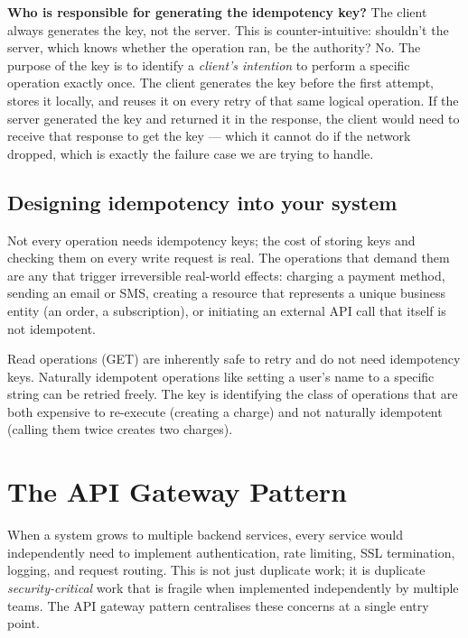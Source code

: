 \documentclass[11pt,a4paper]{article}
\begin{document}
\begin{thinkbox}
\textbf{Who is responsible for generating the idempotency key?} The client always generates the key, not the server. This is counter-intuitive: shouldn't the server, which knows whether the operation ran, be the authority? No. The purpose of the key is to identify a \emph{client's intention} to perform a specific operation exactly once. The client generates the key before the first attempt, stores it locally, and reuses it on every retry of that same logical operation. If the server generated the key and returned it in the response, the client would need to receive that response to get the key --- which it cannot do if the network dropped, which is exactly the failure case we are trying to handle.
\end{thinkbox}

\subsection{Designing idempotency into your system}

Not every operation needs idempotency keys; the cost of storing keys and checking them on every write request is real. The operations that demand them are any that trigger irreversible real-world effects: charging a payment method, sending an email or SMS, creating a resource that represents a unique business entity (an order, a subscription), or initiating an external API call that itself is not idempotent.

Read operations (GET) are inherently safe to retry and do not need idempotency keys. Naturally idempotent operations like setting a user's name to a specific string can be retried freely. The key is identifying the class of operations that are both expensive to re-execute (creating a charge) and not naturally idempotent (calling them twice creates two charges).

\section{The API Gateway Pattern}

When a system grows to multiple backend services, every service would independently need to implement authentication, rate limiting, SSL termination, logging, and request routing. This is not just duplicate work; it is duplicate \emph{security-critical} work that is fragile when implemented independently by multiple teams. The API gateway pattern centralises these concerns at a single entry point.
\end{document}

